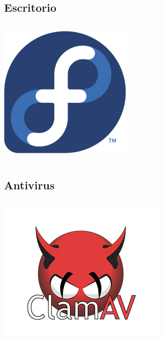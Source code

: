 \subsection{Escritorio}
\begin{frame}
    \begin{columns}
            \includegraphics[width=\textwidth]{Fedora_logo.png}
    \end{columns}
\end{frame}

\subsection{Antivirus}
\begin{frame}
    \begin{columns}
            \includegraphics[width=\textwidth]{clamav.png}
    \end{columns}
\end{frame}

